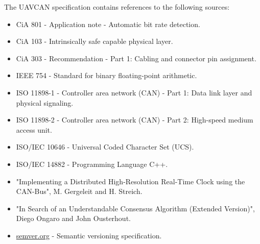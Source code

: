 The UAVCAN specification contains references to the following sources:

\begin{itemize}
    \item CiA 801 - Application note - Automatic bit rate detection.
    \item CiA 103 - Intrinsically safe capable physical layer.
    \item CiA 303 - Recommendation - Part 1: Cabling and connector pin assignment.
    \item IEEE 754 - Standard for binary floating-point arithmetic.
    \item ISO 11898-1 - Controller area network (CAN) - Part 1: Data link layer and physical signaling.
    \item ISO 11898-2 - Controller area network (CAN) - Part 2: High-speed medium access unit.
    \item ISO/IEC 10646 - Universal Coded Character Set (UCS).
    \item ISO/IEC 14882 - Programming Language C++.
    \item "Implementing a Distributed High-Resolution Real-Time Clock using the CAN-Bus", M. Gergeleit and H. Streich.
    \item "In Search of an Understandable Consensus Algorithm (Extended Version)", Diego Ongaro and John Ousterhout.
    \item \href{http://semver.org}{semver.org} - Semantic versioning specification.
\end{itemize}

